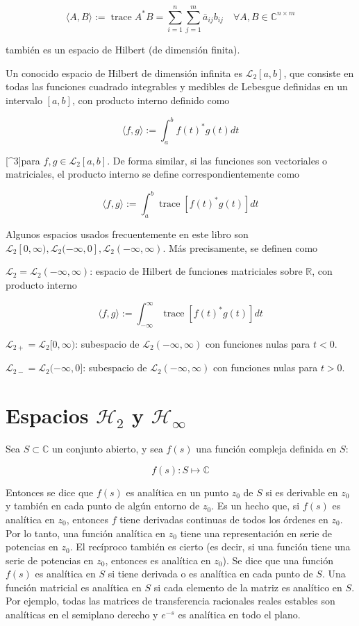 $$
\langle A, B\rangle:=\operatorname{trace} A^{*} B=\sum_{i=1}^{n} \sum_{j=1}^{m} \bar{a}_{i j} b_{i j} \quad \forall A, B \in \mathbb{C}^{n \times m}
$$

también es un espacio de Hilbert (de dimensión finita).

Un conocido espacio de Hilbert de dimensión infinita es $\mathcal{L}_{2}[a, b]$, que consiste en todas las funciones cuadrado integrables y medibles de Lebesgue definidas en un intervalo $[a, b]$, con producto interno definido como

$$
\langle f, g\rangle:=\int_{a}^{b} f(t)^{*} g(t) d t
$$

[\^{}3]para $f, g \in \mathcal{L}_{2}[a, b]$. De forma similar, si las funciones son vectoriales o matriciales, el producto interno se define correspondientemente como

$$
\langle f, g\rangle:=\int_{a}^{b} \operatorname{trace}\left[f(t)^{*} g(t)\right] d t
$$

Algunos espacios usados frecuentemente en este libro son $\mathcal{L}_{2}[0, \infty), \mathcal{L}_{2}(-\infty, 0], \mathcal{L}_{2}(-\infty, \infty)$. Más precisamente, se definen como

$\mathcal{L}_{2}=\mathcal{L}_{2}(-\infty, \infty)$: espacio de Hilbert de funciones matriciales sobre $\mathbb{R}$, con producto interno

$$
\langle f, g\rangle:=\int_{-\infty}^{\infty} \operatorname{trace}\left[f(t)^{*} g(t)\right] d t
$$

$\mathcal{L}_{2+}=\mathcal{L}_{2}[0, \infty)$: subespacio de $\mathcal{L}_{2}(-\infty, \infty)$ con funciones nulas para $t<0$.

$\mathcal{L}_{2-}=\mathcal{L}_{2}(-\infty, 0]$: subespacio de $\mathcal{L}_{2}(-\infty, \infty)$ con funciones nulas para $t>0$.

\section{Espacios $\mathcal{H}_{2}$ y $\mathcal{H}_{\infty}$}
Sea $S \subset \mathbb{C}$ un conjunto abierto, y sea $f(s)$ una función compleja definida en $S$:

$$
f(s): S \longmapsto \mathbb{C}
$$

Entonces se dice que $f(s)$ es analítica en un punto $z_{0}$ de $S$ si es derivable en $z_{0}$ y también en cada punto de algún entorno de $z_{0}$. Es un hecho que, si $f(s)$ es analítica en $z_{0}$, entonces $f$ tiene derivadas continuas de todos los órdenes en $z_{0}$. Por lo tanto, una función analítica en $z_{0}$ tiene una representación en serie de potencias en $z_{0}$. El recíproco también es cierto (es decir, si una función tiene una serie de potencias en $z_{0}$, entonces es analítica en $z_{0}$). Se dice que una función $f(s)$ es analítica en $S$ si tiene derivada o es analítica en cada punto de $S$. Una función matricial es analítica en $S$ si cada elemento de la matriz es analítico en $S$. Por ejemplo, todas las matrices de transferencia racionales reales estables son analíticas en el semiplano derecho y $e^{-s}$ es analítica en todo el plano.


